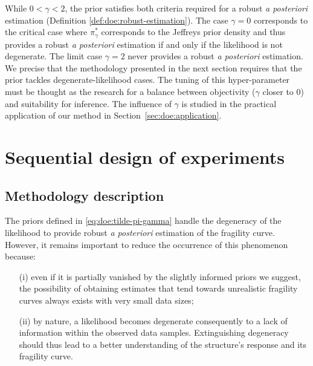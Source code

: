 

While $0<\gamma<2$, the prior satisfies both criteria required for a robust \emph{a posteriori} estimation (Definition \ref{def:doe:robust-estimation}). The case $\gamma=0$ corresponds to the critical case where $\pi^\ast_\gamma$ corresponds to the Jeffreys prior density and thus provides a robust \emph{a posteriori} estimation if and only if the likelihood is not degenerate. The limit case $\gamma=2$ never provides a robust \emph{a posteriori} estimation. We precise that the methodology presented in the next section requires that the prior tackles degenerate-likelihood cases. The tuning of this hyper-parameter must be thought as the research for a balance between objectivity ($\gamma$ closer to $0$) and suitability for inference. The influence of $\gamma$ is studied in the practical application of our method in Section~\ref{sec:doe:application}.











\section{Sequential design of experiments%
}\label{sec:doe:PEmethod}

\subsection{Methodology description}



The priors defined in \cref{eq:doe:tilde-pi-gamma} handle the degeneracy of the likelihood to provide robust \emph{a posteriori} estimation of the fragility curve. However, it remains important to reduce the occurrence of this phenomenon because: %
    \begin{enumerate}
        \item[(i)] even if it is partially vanished by the slightly informed priors we suggest, { the possibility of obtaining estimates that tend towards unrealistic fragility curves always exists with very small data sizes;}
        \item[(ii)] by nature, a likelihood becomes degenerate consequently to a lack of information within the observed data samples. Extinguishing degeneracy should thus lead to a better understanding of the structure's response and its fragility curve.
    \end{enumerate}

